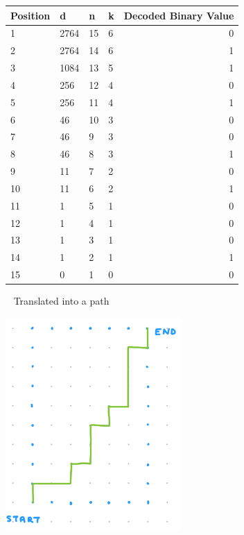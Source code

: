 \documentclass[12pt, letterpaper]{article}
\begin{document}
{
\centering 
\begin{tabular}{ | l | l | l | l | r | }
    \hline
    Position & d & n & k & Decoded Binary Value \\		
    \hline
    \textnormal{1} & \textnormal{2764} & \textnormal{15} & \textnormal{6} & \textnormal{0} \\ 
    \textnormal{2} & \textnormal{2764} & \textnormal{14} & \textnormal{6} & \textnormal{1} \\ 
    \textnormal{3} & \textnormal{1084} & \textnormal{13} & \textnormal{5} & \textnormal{1} \\ 
    \textnormal{4} & \textnormal{256} & \textnormal{12} & \textnormal{4} & \textnormal{0} \\ 
    \textnormal{5} & \textnormal{256} & \textnormal{11} & \textnormal{4} & \textnormal{1} \\ 
    \textnormal{6} & \textnormal{46} & \textnormal{10} & \textnormal{3} & \textnormal{0} \\ 
    \textnormal{7} & \textnormal{46} & \textnormal{9} & \textnormal{3} & \textnormal{0} \\ 
    \textnormal{8} & \textnormal{46} & \textnormal{8} & \textnormal{3} & \textnormal{1} \\ 
    \textnormal{9} & \textnormal{11} & \textnormal{7} & \textnormal{2} & \textnormal{0} \\ 
    \textnormal{10} & \textnormal{11} & \textnormal{6} & \textnormal{2} & \textnormal{1} \\ 
    \textnormal{11} & \textnormal{1} & \textnormal{5} & \textnormal{1} & \textnormal{0} \\ 
    \textnormal{12} & \textnormal{1} & \textnormal{4} & \textnormal{1} & \textnormal{0} \\ 
    \textnormal{13} & \textnormal{1} & \textnormal{3} & \textnormal{1} & \textnormal{0} \\ 
    \textnormal{14} & \textnormal{1} & \textnormal{2} & \textnormal{1} & \textnormal{1} \\ 
    \textnormal{15} & \textnormal{0} & \textnormal{1} & \textnormal{0} & \textnormal{0} \\ 
    \hline  
  \end{tabular}\par
}

\-\ \newline
\textnormal{Translated into a path}
\-\ \newline
\begin{center}
  \includegraphics[width=0.5\textwidth]{graph2.jpeg}
\end{center}
\end{document}
